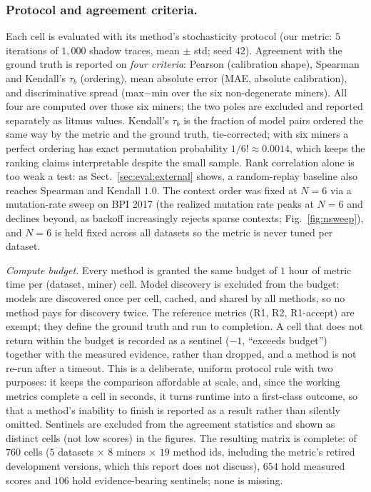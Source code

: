 \documentclass[runningheads]{llncs}
\newcommand{\chg}[1]{\textcolor{chgblue}{#1}}
\begin{document}
\subsubsection{Protocol and agreement criteria.}
Each cell is evaluated with its method's stochasticity protocol (our metric: $5$ iterations of $1{,}000$ shadow traces, mean $\pm$ std; seed $42$). Agreement with the ground truth is reported on \emph{four criteria}: Pearson (calibration shape), Spearman and Kendall's $\tau_b$ (ordering), mean absolute error (MAE, absolute calibration), and discriminative spread (max$-$min over the six non-degenerate miners). All four are computed over those six miners; the two poles are excluded and reported separately as litmus values. Kendall's $\tau_b$ is the fraction of model pairs ordered the same way by the metric and the ground truth, tie-corrected; with six miners a perfect ordering has exact permutation probability $1/6!\approx0.0014$, which keeps the ranking claims interpretable despite the small sample. Rank correlation alone is too weak a test: as Sect.~\ref{sec:eval:external} shows, a random-replay baseline also reaches Spearman and Kendall $1.0$. The context order was fixed at $N{=}6$ via a mutation-rate sweep on BPI 2017 (the realized mutation rate peaks at $N{=}6$ and declines beyond, as backoff increasingly rejects sparse contexts; Fig.~\ref{fig:nsweep}), and $N{=}6$ is held fixed across all datasets so the metric is never tuned per dataset.

\chg{\emph{Compute budget.} Every method is granted the same budget of $1$ hour of metric time per (dataset, miner) cell. Model discovery is excluded from the budget: models are discovered once per cell, cached, and shared by all methods, so no method pays for discovery twice. The reference metrics (R1, R2, R1-accept) are exempt; they define the ground truth and run to completion. A cell that does not return within the budget is recorded as a sentinel ($-1$, ``exceeds budget'') together with the measured evidence, rather than dropped, and a method is not re-run after a timeout. This is a deliberate, uniform protocol rule with two purposes: it keeps the comparison affordable at scale, and, since the working metrics complete a cell in seconds, it turns runtime into a first-class outcome, so that a method's inability to finish is reported as a result rather than silently omitted. Sentinels are excluded from the agreement statistics and shown as distinct cells (not low scores) in the figures. The resulting matrix is complete: of $760$ cells ($5$ datasets $\times$ $8$ miners $\times$ $19$ method ids, including the metric's retired development versions, which this report does not discuss), $654$ hold measured scores and $106$ hold evidence-bearing sentinels; none is missing.}
\end{document}
